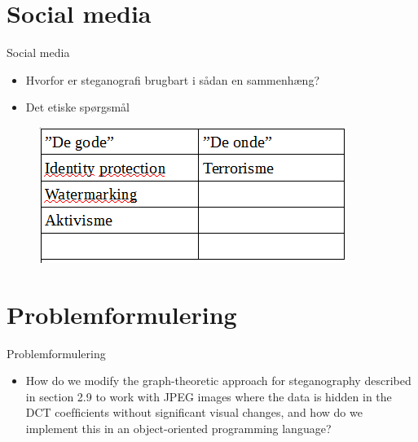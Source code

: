 \section{Social media}
\begin{frame}{Social media}{}
	\begin{itemize}
		\item Hvorfor er steganografi brugbart i sådan en sammenhæng?
		\item Det etiske spørgsmål		 
	\end{itemize}
	\begin{figure}[!H]
			\centering
			\includegraphics[width=.55\textwidth]{./Tessa/tabel.png}
	\end{figure}
\end{frame}

\section{Problemformulering}
\begin{frame}{Problemformulering}{}
	\begin{itemize}
		\item How do we modify the graph-theoretic approach for steganography described in section 2.9 to work with JPEG images where the data is hidden in the DCT coefﬁcients without signiﬁcant visual changes, and how do we implement this in an object-oriented programming language?
	\end{itemize}
\end{frame}
